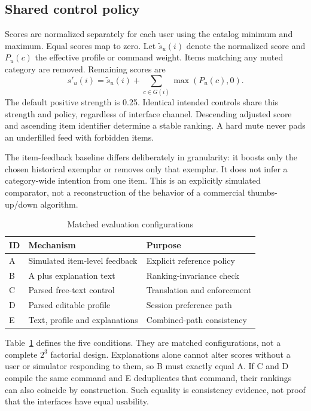 \documentclass[conference]{IEEEtran}
\newcommand{\toprule}{\hline}
\newcommand{\midrule}{\hline}
\newcommand{\bottomrule}{\hline}
\begin{document}
\subsection{Shared control policy}
Scores are normalized separately for each user using the catalog minimum and maximum. Equal scores map to zero. Let $\tilde s_u(i)$ denote the normalized score and $P_u(c)$ the effective profile or command weight. Items matching any muted category are removed. Remaining scores are
\begin{equation}
 s'_u(i)=\tilde s_u(i)+\sum_{c\in G(i)}\max(P_u(c),0).
\end{equation}
The default positive strength is 0.25. Identical intended controls share this strength and policy, regardless of interface channel. Descending adjusted score and ascending item identifier determine a stable ranking. A hard mute never pads an underfilled feed with forbidden items.

The item-feedback baseline differs deliberately in granularity: it boosts only the chosen historical exemplar or removes only that exemplar. It does not infer a category-wide intention from one item. This is an explicitly simulated comparator, not a reconstruction of the behavior of a commercial thumbs-up/down algorithm.

\begin{table}[t]
\caption{Matched evaluation configurations}
\label{tab:conditions}
\centering\small
\begin{tabular}{@{}p{}p{}p{}@{}}
\toprule
ID & Mechanism & Purpose\\\midrule
A & Simulated item-level feedback & Explicit reference policy\\
B & A plus explanation text & Ranking-invariance check\\
C & Parsed free-text control & Translation and enforcement\\
D & Parsed editable profile & Session preference path\\
E & Text, profile and explanations & Combined-path consistency\\\bottomrule
\end{tabular}
\end{table}

Table~\ref{tab:conditions} defines the five conditions. They are matched configurations, not a complete $2^3$ factorial design. Explanations alone cannot alter scores without a user or simulator responding to them, so B must exactly equal A. If C and D compile the same command and E deduplicates that command, their rankings can also coincide by construction. Such equality is consistency evidence, not proof that the interfaces have equal usability.
\end{document}
